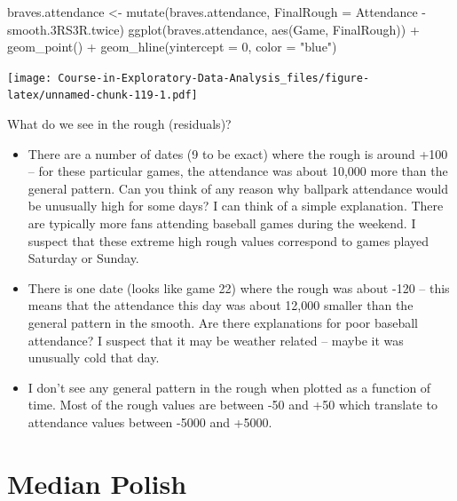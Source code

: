 \documentclass[
]{book}
\newenvironment{Shaded}{\begin{snugshade}}{\end{snugshade}}
\newcommand{\AttributeTok}[1]{\textcolor[rgb]{0.77,0.63,0.00}{#1}}
\newcommand{\DecValTok}[1]{\textcolor[rgb]{0.00,0.00,0.81}{#1}}
\newcommand{\FloatTok}[1]{\textcolor[rgb]{0.00,0.00,0.81}{#1}}
\newcommand{\FunctionTok}[1]{\textcolor[rgb]{0.00,0.00,0.00}{#1}}
\newcommand{\NormalTok}[1]{#1}
\newcommand{\OtherTok}[1]{\textcolor[rgb]{0.56,0.35,0.01}{#1}}
\newcommand{\SpecialCharTok}[1]{\textcolor[rgb]{0.00,0.00,0.00}{#1}}
\newcommand{\StringTok}[1]{\textcolor[rgb]{0.31,0.60,0.02}{#1}}
\providecommand{\tightlist}{%
  \setlength{\itemsep}{0pt}\setlength{\parskip}{0pt}}
\begin{document}
\begin{Shaded}
\begin{Highlighting}[]
\NormalTok{braves.attendance }\OtherTok{\textless{}{-}} \FunctionTok{mutate}\NormalTok{(braves.attendance,}
                            \AttributeTok{FinalRough =}\NormalTok{ Attendance }\SpecialCharTok{{-}} 
\NormalTok{                              smooth}\FloatTok{.3}\NormalTok{RS3R.twice)}
\FunctionTok{ggplot}\NormalTok{(braves.attendance,}
       \FunctionTok{aes}\NormalTok{(Game, FinalRough)) }\SpecialCharTok{+}
  \FunctionTok{geom\_point}\NormalTok{() }\SpecialCharTok{+}
  \FunctionTok{geom\_hline}\NormalTok{(}\AttributeTok{yintercept =} \DecValTok{0}\NormalTok{, }\AttributeTok{color =} \StringTok{"blue"}\NormalTok{)}
\end{Highlighting}
\end{Shaded}

\texttt{[image: Course-in-Exploratory-Data-Analysis\_files/figure-latex/unnamed-chunk-119-1.pdf]}

What do we see in the rough (residuals)?

\begin{itemize}
\tightlist
\item
  There are a number of dates (9 to be exact) where the rough is around +100 -- for these particular games, the attendance was about 10,000 more than the general pattern. Can you think of any reason why ballpark attendance would be unusually high for some days? I can think of a simple explanation. There are typically more fans attending baseball games during the weekend. I suspect that these extreme high rough values correspond to games played Saturday or Sunday.
\item
  There is one date (looks like game 22) where the rough was about -120 -- this means that the attendance this day was about 12,000 smaller than the general pattern in the smooth. Are there explanations for poor baseball attendance? I suspect that it may be weather related -- maybe it was unusually cold that day.
\item
  I don't see any general pattern in the rough when plotted as a function of time. Most of the rough values are between -50 and +50 which translate to attendance values between -5000 and +5000.
\end{itemize}

\hypertarget{median-polish}{%
\chapter{Median Polish}\label{median-polish}}
\end{document}
